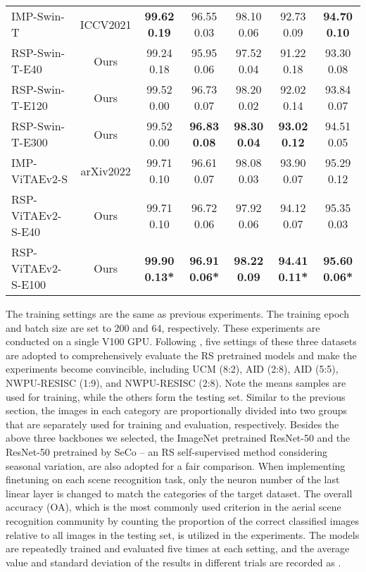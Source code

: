 \documentclass[10pt, journal,twoside]{IEEEtran}
\begin{document}
\begin{table*}[t]
{\begin{tabular}{l|c|c|c|c|c|c}
  \hline
  IMP-Swin-T \cite{swint} & ICCV2021 & \bfseries 99.62  0.19 & 96.55  0.03 & 98.10  0.06 & 92.73  0.09 & \bfseries 94.70  0.10 \\
  RSP-Swin-T-E40 & Ours & 99.24  0.18 & 95.95  0.06 & 97.52  0.04  & 91.22  0.18 & 93.30  0.08 \\
  RSP-Swin-T-E120 & Ours & 99.52  0.00 & 96.73  0.07 & 98.20  0.02 & 92.02  0.14 & 93.84  0.07 \\
  RSP-Swin-T-E300 & Ours & 99.52  0.00 & \bfseries 96.83  0.08 &\bfseries 98.30  0.04 & \bfseries 93.02  0.12 & 94.51  0.05 \\
  \hline
  IMP-ViTAEv2-S \cite{vitae_v2} & arXiv2022 & 99.71  0.10 & 96.61  0.07 & 98.08  0.03 & 93.90  0.07 & 95.29  0.12 \\ 
  RSP-ViTAEv2-S-E40 & Ours & 99.71  0.10 & 96.72  0.06 & 97.92  0.06 & 94.12  0.07& 95.35  0.03\\
  RSP-ViTAEv2-S-E100 & Ours & \bfseries 99.90  0.13\textbf{*} & \bfseries 96.91  0.06\textbf{*} & \bfseries 98.22  0.09 &\bfseries 94.41  0.11\textbf{*} & \bfseries 95.60  0.06\textbf{*} \\
  \hline
\end{tabular}
  }
  \label{asr}
\end{table*}

The training settings are the same as previous experiments. The training epoch and batch size are set to 200 and 64, respectively. These experiments are conducted on a single V100 GPU. Following \cite{mblanet_2021_asr}, five settings of these three datasets are adopted to comprehensively evaluate the RS pretrained models and make the experiments become convincible, including UCM (8:2), AID (2:8), AID (5:5), NWPU-RESISC (1:9), and NWPU-RESISC (2:8). Note the  means  samples are used for training, while the others form the testing set. Similar to the previous section, the images in each category are proportionally divided into two groups that are separately used for training and evaluation, respectively. Besides the above three backbones we selected, the ImageNet pretrained ResNet-50 and the ResNet-50 pretrained by SeCo \cite{seco} -- an RS self-supervised method considering seasonal variation, are also adopted for a fair comparison. When implementing finetuning on each scene recognition task, only the neuron number of the last linear layer is changed to match the categories of the target dataset. The overall accuracy (OA), which is the most commonly used criterion in the aerial scene recognition community by counting the proportion of the correct classified images relative to all images in the testing set, is utilized in the experiments. The models are repeatedly trained and evaluated five times at each setting, and the average value  and standard deviation  of the results in different trials are recorded as .
\end{document}
